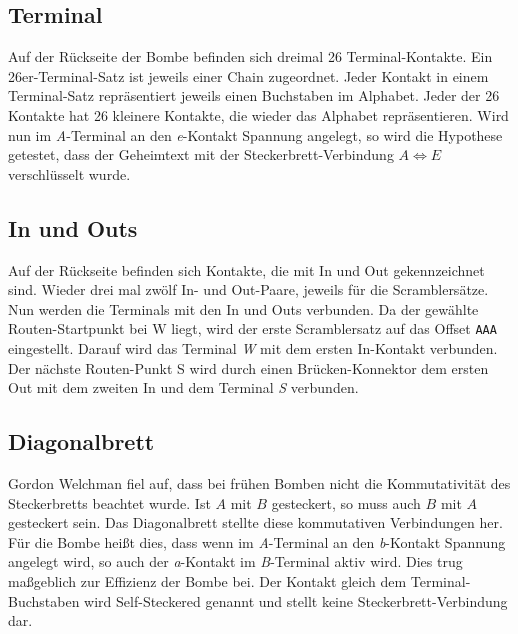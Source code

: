 \subsection{Terminal}\label{subsec:terminal}
Auf der Rückseite der Bombe befinden sich dreimal 26 Terminal-Kontakte.
Ein 26er-Terminal-Satz ist jeweils einer Chain zugeordnet.
Jeder Kontakt in einem Terminal-Satz repräsentiert jeweils einen Buchstaben im Alphabet.
Jeder der 26 Kontakte hat 26 kleinere Kontakte, die wieder das Alphabet repräsentieren.
Wird nun im \emph{A}-Terminal an den \emph{e}-Kontakt Spannung angelegt, so wird die Hypothese getestet, dass der Geheimtext mit der Steckerbrett-Verbindung $A \Leftrightarrow E$ verschlüsselt wurde.

\subsection{In und Outs}\label{subsec:in_und_out}
Auf der Rückseite befinden sich Kontakte, die mit \glqq In\grqq{} und \glqq Out\grqq{} gekennzeichnet sind.
Wieder drei mal zwölf In- und Out-Paare, jeweils für die Scramblersätze.
Nun werden die Terminals mit den In und Outs verbunden.
Da der gewählte Routen-Startpunkt bei \glqq W\grqq{} liegt, wird der erste Scramblersatz auf das Offset \texttt{AAA} eingestellt.
Darauf wird das Terminal \emph{W} mit dem ersten In-Kontakt verbunden.
Der nächste Routen-Punkt \glqq S\grqq{} wird durch einen \glqq Brücken-Konnektor\grqq{} dem ersten Out mit dem zweiten In und dem Terminal \emph{S} verbunden.

\subsection{Diagonalbrett}\label{subsec:diagonalboard}
Gordon Welchman fiel auf, dass bei frühen Bomben nicht die Kommutativität des Steckerbretts beachtet wurde.
Ist $A$ mit $B$ gesteckert, so muss auch $B$ mit $A$ gesteckert sein.
Das Diagonalbrett stellte diese kommutativen Verbindungen her.
Für die Bombe heißt dies, dass wenn im \emph{A}-Terminal an den \emph{b}-Kontakt Spannung angelegt wird,
so auch der \emph{a}-Kontakt im \emph{B}-Terminal aktiv wird.
Dies trug maßgeblich zur Effizienz der Bombe bei.
Der Kontakt gleich dem Terminal-Buchstaben wird \glqq Self-Steckered\grqq{} genannt und stellt keine Steckerbrett-Verbindung dar.

